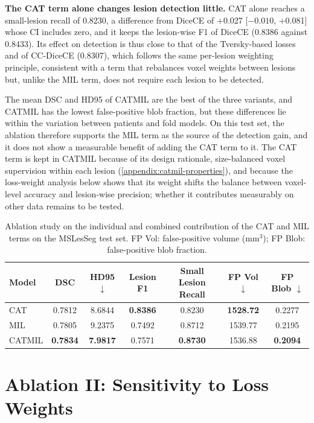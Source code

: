 \textbf{The CAT term alone changes lesion detection little.} CAT alone
reaches a small-lesion recall of 0.8230, a difference from DiceCE of
+0.027 [$-0.010$, +0.081] whose CI includes zero, and it keeps the
lesion-wise F1 of DiceCE (0.8386 against 0.8433). Its effect on detection
is thus close to that of the Tversky-based losses and of CC-DiceCE
(0.8307), which follows the same per-lesion weighting principle, consistent
with a term
that rebalances voxel weights between lesions but, unlike the MIL term,
does not require each lesion to be detected.

The mean DSC and HD95 of CATMIL are the best of the three variants, and
CATMIL has the lowest false-positive blob fraction, but these differences
lie within the variation between patients and fold models. On this test
set, the ablation therefore supports the MIL term as the source of the
detection gain, and it does not show a measurable benefit of adding the
CAT term to it. The CAT term is kept in CATMIL because of its design
rationale, size-balanced voxel supervision within each lesion
(\cref{appendix:catmil-properties}), and because the loss-weight analysis
below shows that its weight shifts the balance between voxel-level accuracy
and lesion-wise precision; whether it contributes measurably on other data
remains to be tested.

\begin{table}[H]
\centering
\caption{Ablation study on the individual and combined contribution of the
CAT and MIL terms on the MSLesSeg test set. FP Vol: false-positive volume
(mm$^3$); FP Blob: false-positive blob fraction.}
\label{tab:ablation_cat_mil}
\begin{tabular}{lcccccc}
\toprule
Model & DSC & HD95 $\downarrow$ & Lesion F1 & Small Lesion Recall & FP Vol $\downarrow$ & FP Blob $\downarrow$ \\
\midrule
CAT    & 0.7812 & 8.6844 & \textbf{0.8386} & 0.8230 & \textbf{1528.72} & 0.2277 \\
MIL    & 0.7805 & 9.2375 & 0.7492 & 0.8712 & 1539.77 & 0.2195 \\
CATMIL & \textbf{0.7834} & \textbf{7.9817} & 0.7571 & \textbf{0.8730} & 1536.88 & \textbf{0.2094} \\
\bottomrule
\end{tabular}
\end{table}

\section{Ablation II: Sensitivity to Loss Weights}
\label{appendix:catmil-loss-weights}

